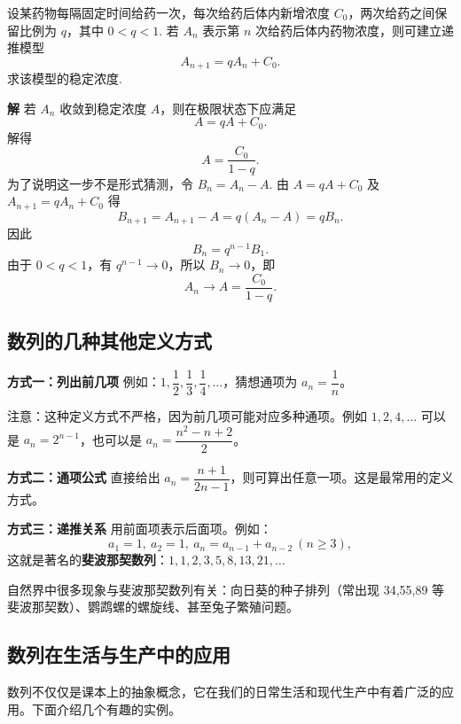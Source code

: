 \documentclass[fontset=fandol]{ctexart}
\newenvironment{custom}[1]{\par\noindent\textbf{#1}\quad}{\par\vspace{0.8em}}
\begin{document}
\begin{example}
设某药物每隔固定时间给药一次，每次给药后体内新增浓度 $C_0$，两次给药之间保留比例为 $q$，其中 $0<q<1$. 若 $A_n$ 表示第 $n$ 次给药后体内药物浓度，则可建立递推模型
\[
A_{n+1}=qA_n+C_0.
\]
求该模型的稳定浓度.
\end{example}
\begin{custom}{解}
若 $A_n$ 收敛到稳定浓度 $A$，则在极限状态下应满足
\[
A=qA+C_0.
\]
解得
\[
A=\frac{C_0}{1-q}.
\]
为了说明这一步不是形式猜测，令 $B_n=A_n-A$. 由 $A=qA+C_0$ 及 $A_{n+1}=qA_n+C_0$ 得
\[
B_{n+1}=A_{n+1}-A=q(A_n-A)=qB_n.
\]
因此
\[
B_n=q^{n-1}B_1.
\]
由于 $0<q<1$，有 $q^{n-1}\to0$，所以 $B_n\to0$，即
\[
A_n\to A=\frac{C_0}{1-q}.
\]
\end{custom}

\subsection{数列的几种其他定义方式}

\begin{custom}{方式一：列出前几项}
例如：\(1, \dfrac12, \dfrac13, \dfrac14, \dots\)，猜想通项为 \(a_n = \dfrac1n\)。

注意：这种定义方式不严格，因为前几项可能对应多种通项。例如 \(1,2,4,\dots\) 可以是 \(a_n=2^{n-1}\)，也可以是 \(a_n = \dfrac{n^2-n+2}{2}\)。
\end{custom}

\begin{custom}{方式二：通项公式}
直接给出 \(a_n = \dfrac{n+1}{2n-1}\)，则可算出任意一项。这是最常用的定义方式。
\end{custom}

\begin{custom}{方式三：递推关系}
用前面项表示后面项。例如：
\[
a_1 = 1,\ a_2 = 1,\ a_n = a_{n-1} + a_{n-2}\ (n \geq 3),
\]
这就是著名的\textbf{斐波那契数列}：\(1,1,2,3,5,8,13,21,\dots\)

自然界中很多现象与斐波那契数列有关：向日葵的种子排列（常出现 34,55,89 等斐波那契数）、鹦鹉螺的螺旋线、甚至兔子繁殖问题。
\end{custom}

\subsection{数列在生活与生产中的应用}

数列不仅仅是课本上的抽象概念，它在我们的日常生活和现代生产中有着广泛的应用。下面介绍几个有趣的实例。
\end{document}
